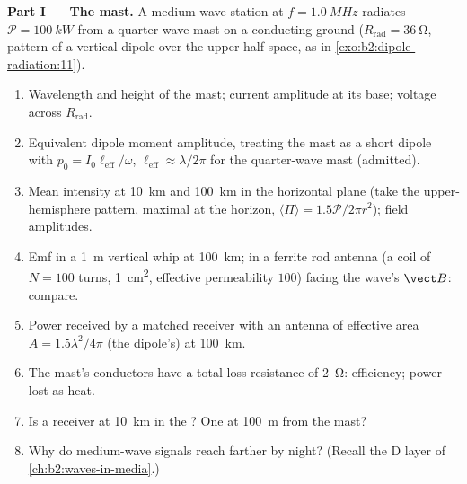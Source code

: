 \begin{problem}
\label{pb:b2:dipole-radiation:1}

\medskip
\noindent\textbf{Part I --- The mast.}
A medium-wave station at $f = \qty{1.0}{MHz}$ radiates $\mathcal P = \qty{100}{kW}$
from a quarter-wave mast on a conducting ground ($R_{\text{rad}} = \qty{36}{\ohm}$,
pattern of a vertical dipole over the upper half-space, as in
\cref{exo:b2:dipole-radiation:11}).
\begin{enumerate}
  \item Wavelength and height of the mast; current amplitude at its
        base; voltage across $R_{\text{rad}}$.
  \item Equivalent dipole moment amplitude, treating the mast as a
        short dipole with $p_0 = I_0\ell_{\text{eff}}/\omega$, $\ell_{\text{eff}} \approx
        \lambda/2\pi$ for the quarter-wave mast (admitted).
  \item Mean intensity at \qty{10}{km} and \qty{100}{km} in the horizontal
        plane (take the upper-hemisphere pattern, maximal at the
        horizon, $\langle\Pi\rangle = 1.5\mathcal P/2\pi r^2$); field amplitudes.
  \item Emf in a \qty{1}{m} vertical whip at \qty{100}{km}; in a ferrite
        rod antenna (a coil of $N = 100$ turns, \qty{1}{cm^2}, effective
        permeability $100$) facing the wave's $\vect B$: compare.
  \item Power received by a matched receiver with an antenna of
        effective area $A = 1.5\lambda^2/4\pi$ (the dipole's) at \qty{100}{km}.
  \item The mast's conductors have a total loss resistance of
        \qty{2}{\ohm}: efficiency; power lost as heat.
  \item Is a receiver at \qty{10}{km} in the ? One at
        \qty{100}{m} from the mast?
  \item Why do medium-wave signals reach farther by night? (Recall the
        D layer of \cref{ch:b2:waves-in-media}.)
\end{enumerate}


\end{problem}
